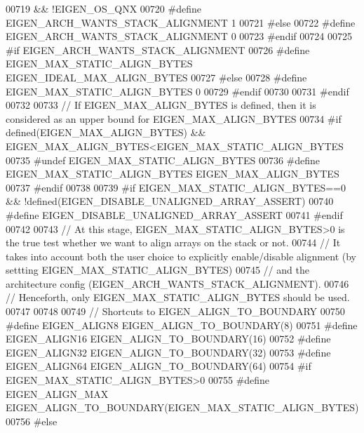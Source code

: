 \begin{DoxyCode}
00719 \textcolor{preprocessor}{  && !EIGEN\_OS\_QNX}
00720 \textcolor{preprocessor}{    #define EIGEN\_ARCH\_WANTS\_STACK\_ALIGNMENT 1}
00721 \textcolor{preprocessor}{  #else}
00722 \textcolor{preprocessor}{    #define EIGEN\_ARCH\_WANTS\_STACK\_ALIGNMENT 0}
00723 \textcolor{preprocessor}{  #endif}
00724 
00725 \textcolor{preprocessor}{  #if EIGEN\_ARCH\_WANTS\_STACK\_ALIGNMENT}
00726 \textcolor{preprocessor}{    #define EIGEN\_MAX\_STATIC\_ALIGN\_BYTES EIGEN\_IDEAL\_MAX\_ALIGN\_BYTES}
00727 \textcolor{preprocessor}{  #else}
00728 \textcolor{preprocessor}{    #define EIGEN\_MAX\_STATIC\_ALIGN\_BYTES 0}
00729 \textcolor{preprocessor}{  #endif}
00730 
00731 \textcolor{preprocessor}{#endif}
00732 
00733 \textcolor{comment}{// If EIGEN\_MAX\_ALIGN\_BYTES is defined, then it is considered as an upper bound for EIGEN\_MAX\_ALIGN\_BYTES}
00734 \textcolor{preprocessor}{#if defined(EIGEN\_MAX\_ALIGN\_BYTES) && EIGEN\_MAX\_ALIGN\_BYTES<EIGEN\_MAX\_STATIC\_ALIGN\_BYTES}
00735 \textcolor{preprocessor}{#undef EIGEN\_MAX\_STATIC\_ALIGN\_BYTES}
00736 \textcolor{preprocessor}{#define EIGEN\_MAX\_STATIC\_ALIGN\_BYTES EIGEN\_MAX\_ALIGN\_BYTES}
00737 \textcolor{preprocessor}{#endif}
00738 
00739 \textcolor{preprocessor}{#if EIGEN\_MAX\_STATIC\_ALIGN\_BYTES==0 && !defined(EIGEN\_DISABLE\_UNALIGNED\_ARRAY\_ASSERT)}
00740 \textcolor{preprocessor}{  #define EIGEN\_DISABLE\_UNALIGNED\_ARRAY\_ASSERT}
00741 \textcolor{preprocessor}{#endif}
00742 
00743 \textcolor{comment}{// At this stage, EIGEN\_MAX\_STATIC\_ALIGN\_BYTES>0 is the true test whether we want to align arrays on the
       stack or not.}
00744 \textcolor{comment}{// It takes into account both the user choice to explicitly enable/disable alignment (by settting
       EIGEN\_MAX\_STATIC\_ALIGN\_BYTES)}
00745 \textcolor{comment}{// and the architecture config (EIGEN\_ARCH\_WANTS\_STACK\_ALIGNMENT).}
00746 \textcolor{comment}{// Henceforth, only EIGEN\_MAX\_STATIC\_ALIGN\_BYTES should be used.}
00747 
00748 
00749 \textcolor{comment}{// Shortcuts to EIGEN\_ALIGN\_TO\_BOUNDARY}
00750 \textcolor{preprocessor}{#define EIGEN\_ALIGN8  EIGEN\_ALIGN\_TO\_BOUNDARY(8)}
00751 \textcolor{preprocessor}{#define EIGEN\_ALIGN16 EIGEN\_ALIGN\_TO\_BOUNDARY(16)}
00752 \textcolor{preprocessor}{#define EIGEN\_ALIGN32 EIGEN\_ALIGN\_TO\_BOUNDARY(32)}
00753 \textcolor{preprocessor}{#define EIGEN\_ALIGN64 EIGEN\_ALIGN\_TO\_BOUNDARY(64)}
00754 \textcolor{preprocessor}{#if EIGEN\_MAX\_STATIC\_ALIGN\_BYTES>0}
00755 \textcolor{preprocessor}{#define EIGEN\_ALIGN\_MAX EIGEN\_ALIGN\_TO\_BOUNDARY(EIGEN\_MAX\_STATIC\_ALIGN\_BYTES)}
00756 \textcolor{preprocessor}{#else}

\end{DoxyCode}
